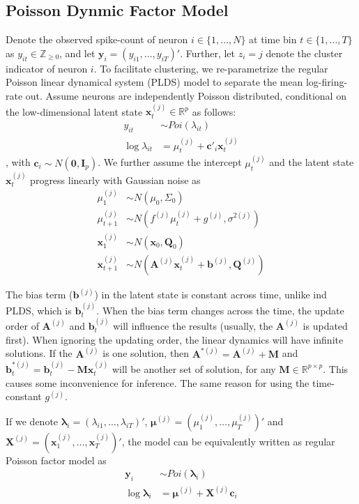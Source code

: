 \documentclass{article}
\begin{document}
	\subsection{Poisson Dynmic Factor Model}
	Denote the observed spike-count of neuron $i \in \{ 1,\ldots,N\}$ at
	time bin $t \in \{ 1,\ldots,T\}$ as
	$y_{it} \in \mathbb{Z}_{\geq 0}$, and let
	$\bm{y}_{i} =  (y_{i1},\ldots,y_{iT})'$.
	Further, let $z_{i} = j$ denote the cluster indicator of neuron $i$. To facilitate clustering, we re-parametrize the regular Poisson linear dynamical system (PLDS) model \citep{Macke2011} to separate the mean log-firing-rate out. Assume neurons are independently Poisson distributed, conditional on the
	low-dimensional latent state $\bm{x}_{t}^{(j)} \in \mathbb{R}^{p}$ as follows:
	\begin{align*}
		y_{it} &\sim Poi(\lambda_{it})\\
		\log\lambda_{it} &= \mu_t^{(j)} + \bm{c}'_i\bm{x}^{(j)}_t
	\end{align*}
	, with $\bm{c}_i\sim N(\bm{0},\bm{I}_p)$. We further assume the intercept $\mu_t^{(j)}$ and the latent state $\bm{x}^{(j)}_t$ progress linearly with Gaussian noise as
	\begin{align*}
		\mu_1^{(j)} &\sim N(\mu_0, \Sigma_0)\\
		\mu_{t+1}^{(j)} &\sim N(f^{(j)}\mu_t^{(j)} + g^{(j)}, \sigma^{2(j)})\\
		\bm{x}_1^{(j)} &\sim N(\bm{x}_0, \bm{Q}_0)\\
		\bm{x}_{t+1}^{(j)} &\sim N(\bm{A}^{(j)}\bm{x}_t^{(j)} + \bm{b}^{(j)}, \bm{Q}^{(j)})
	\end{align*}
	
	The bias term ($\bm{b}^{(j)}$) in the latent state is constant across time, unlike ind PLDS, which is  $\bm{b}_t^{(j)}$. When the bias term changes across the time, the update order of $\bm{A}^{(j)}$ and $\bm{b}_t^{(j)}$ will influence the results (usually, the $\bm{A}^{(j)}$ is updated first). When ignoring the updating order, the linear dynamics will have infinite solutions. If the $\bm{A}^{(j)}$ is one solution, then $\bm{A}^{*(j)} = \bm{A}^{(j)} + \bm{M}$ and $\bm{b}_t^{*(j)} = \bm{b}_t^{(j)} - \bm{M}\bm{x}^{(j)}_t$ will be another set of solution, for any $\bm{M} \in \mathbb{R}^{p\times p}$. This causes some inconvenience for inference. The same reason for using the time-constant $g^{(j)}$.
	
	If we denote $\bm{\lambda}_{i} =  (\lambda_{i1},\ldots,\lambda_{iT})'$, $\bm{\mu}^{(j)} = (\mu^{(j)}_1,\ldots,\mu^{(j)}_T)'$ and $\bm{X}^{(j)} = (\bm{x}^{(j)}_1,\ldots,\bm{x}^{(j)}_T)'$, the model can be equivalently written as regular Poisson factor model as
	\begin{align*}
		\bm{y}_i &\sim Poi(\bm{\lambda}_i)\\
		\log\bm{\lambda}_i &= \bm{\mu}^{(j)}+ \bm{X}^{(j)}\bm{c}_i 
	\end{align*}
\end{document}
